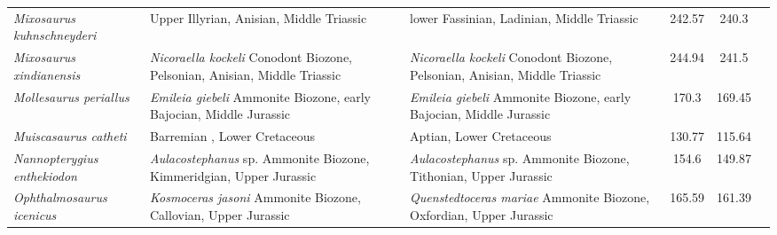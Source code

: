 \begin{longtabu}{>{\itshape}lXXSSl}
	Mixosaurus kuhnschneyderi                            & Upper Illyrian, Anisian, Middle Triassic                                                                                           & lower Fassinian, Ladinian, Middle Triassic                                                                                         & 242.57                   & 240.3                    & \cite{Brinkmann1998} \\                  
	Mixosaurus xindianensis                              & \emph{Nicoraella kockeli} Conodont Biozone, Pelsonian, Anisian, Middle Triassic                                                    & \emph{Nicoraella kockeli} Conodont Biozone, Pelsonian, Anisian, Middle Triassic                                                    & 244.94                   & 241.5                    & \cite{Chen2010} \\                       
	Mollesaurus periallus                                & \emph{Emileia giebeli} Ammonite Biozone, early Bajocian, Middle Jurassic                                                           & \emph{Emileia giebeli} Ammonite Biozone, early Bajocian, Middle Jurassic                                                           & 170.3                    & 169.45                   & \cite{Fernandez2014,Fernandez1999} \\    
	Muiscasaurus catheti                                 & Barremian , Lower Cretaceous                                                                                                       & Aptian, Lower Cretaceous                                                                                                           & 130.77                   & 115.64                   & \cite{Maxwell2016} \\                    
	Nannopterygius enthekiodon                           & \emph{Aulacostephanus} sp. Ammonite Biozone, Kimmeridgian, Upper Jurassic                                                          & \emph{Aulacostephanus} sp. Ammonite Biozone, Tithonian, Upper Jurassic                                                             & 154.6                    & 149.87                   & \cite{Moon2018} \\                       
	Ophthalmosaurus icenicus                             & \emph{Kosmoceras jasoni} Ammonite Biozone, Callovian, Upper Jurassic                                                               & \emph{Quenstedtoceras mariae} Ammonite Biozone, Oxfordian, Upper Jurassic                                                          & 165.59                   & 161.39                   & \cite{Moon2016} \\                       

\end{longtabu}
